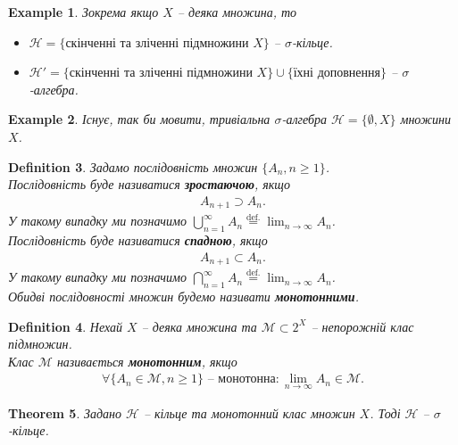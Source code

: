 \documentclass[a4paper, 10pt]{article}
\theoremstyle{theoremdd}
\newtheorem{theorem}{Theorem}[subsection]
\newtheorem{definition}[theorem]{Definition}
\newtheorem{example}[theorem]{Example}
\begin{document}
\begin{example}
Зокрема якщо $X$ -- деяка множина, то
\begin{itemize}[nosep,wide=0pt]
\item $\mathcal{H} = \{ \text{скінченні та зліченні підмножини $X$} \}$ -- $\sigma$-кільце.
\item $\mathcal{H}' = \{ \text{скінченні та зліченні підмножини $X$} \} \cup \{ \text{їхні доповнення} \}$ -- $\sigma$-алгебра.
\end{itemize}
\end{example}

\begin{example}
Існує, так би мовити, тривіальна $\sigma$-алгебра $\mathcal{H} = \{\emptyset,X\}$ множини $X$.
\end{example}

\begin{definition}
Задамо послідовність множин $\{A_n, n \geq 1\}$.\\
Послідовність буде називатися \textbf{зростаючою}, якщо
\begin{align*}
A_{n+1} \supset A_n.
\end{align*}
У такому випадку ми позначимо $\displaystyle\bigcup_{n=1}^\infty A_n \overset{\text{def.}}{=} \lim_{n \to \infty} A_n$.
\bigskip \\
Послідовність буде називатися \textbf{спадною}, якщо
\begin{align*}
A_{n+1} \subset A_n.
\end{align*}
У такому випадку ми позначимо $\displaystyle\bigcap_{n=1}^\infty A_n \overset{\text{def.}}{=} \lim_{n \to \infty} A_n$.
\bigskip \\
Обидві послідовності множин будемо називати \textbf{монотонними}.
\end{definition}

\begin{definition}
Нехай $X$ -- деяка множина та $\mathcal{M} \subset 2^X$ -- непорожній клас підмножин.\\
Клас $\mathcal{M}$ називається \textbf{монотонним}, якщо
\begin{align*}
\forall \{A_n \in \mathcal{M}, n \geq 1\} \text{ -- монотонна}: \displaystyle\lim_{n \to \infty} A_n \in \mathcal{M}.
\end{align*}
\end{definition}

\begin{theorem}
\label{monotonic_ring_is_sigma_ring}
Задано $\mathcal{H}$ -- кільце та монотонний клас множин $X$. Тоді $\mathcal{H}$ -- $\sigma$-кільце.
\end{theorem}
\end{document}
